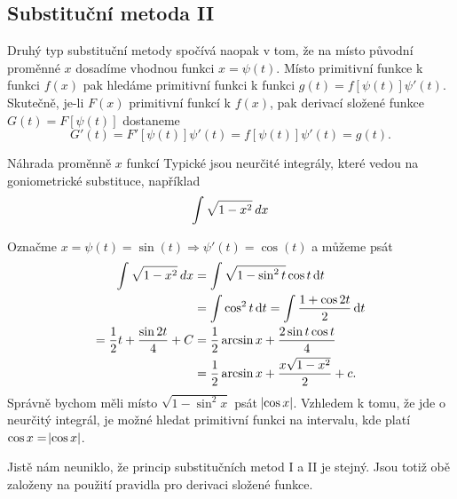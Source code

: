    \subsection{Substituční metoda II}
      Druhý typ substituční metody spočívá naopak v tom, že na místo původní proměnné \(x\) 
      dosadíme vhodnou funkci \(x = \psi(t)\). Místo primitivní funkce k funkci \(f(x)\) pak 
      hledáme primitivní funkci k funkci \(g(t) = f[\psi(t)]\psi'(t)\). Skutečně, je-li \(F(x)\) 
      primitivní funkcí k \(f(x)\), pak derivací složené funkce \(G(t) = F[\psi(t)]\) dostaneme
      \begin{equation*}
       G'(t) = F'[\psi(t)]\psi'(t) = f[\psi(t)]\psi'(t) = g(t).
      \end{equation*}
      
      \begin{example} Náhrada proměnně \(x\) funkcí
        Typické jsou neurčité integrály, které vedou na goniometrické substituce, například
        \[\int\sqrt{1-x^2}\hspace{2pt}dx\]
        
        Označme \(x=\psi(t)=\sin(t)  \Rightarrow \psi'(t)=\cos(t)\) a můžeme psát
        \begin{align*}
          \int\sqrt{1-x^2}\hspace{2pt}dx 
            &= \int\sqrt{1-\sin^2t}\cos t\mathop{}\!\mathrm{d}t                      \\
            &= \int\cos^2 t \mathop{}\!\mathrm{d}t = \int\frac{1+\cos2t}{2}\mathop{}\!\mathrm{d}t    \\
          = \frac{1}{2}t+\frac{\sin2t}{4}+C
            &= \frac{1}{2}\arcsin x + \frac{2\sin t\cos t}{4}        \\
            &= \frac{1}{2}\arcsin x + \frac{x\sqrt{1-x^2}}{2} + c.
        \end{align*}
        Správně bychom měli místo \(\sqrt{1 - \sin^2x}\) psát \(\abs{\cos x}\). Vzhledem k tomu, že 
        jde o neurčitý integrál, je možné hledat primitivní funkci na intervalu, kde platí \(\cos x 
        = \abs{\cos x}\).
      \end{example}
      Jistě nám neuniklo, že princip substitučních metod I a II je stejný. Jsou totiž obě založeny 
      na použití pravidla pro derivaci složené funkce.
  
